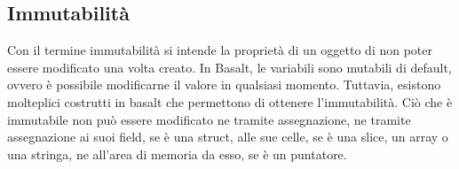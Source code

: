 \subsection{Immutabilità}
Con il termine immutabilità si intende la proprietà di un oggetto di non poter essere modificato una volta creato. In Basalt, le variabili
sono mutabili di default, ovvero è possibile modificarne il valore in qualsiasi momento. Tuttavia, esistono molteplici costrutti in basalt 
che permettono di ottenere l'immutabilità. Ciò che è immutabile non può essere modificato ne tramite assegnazione, ne tramite assegnazione 
ai suoi field, se è una struct, alle sue celle, se è una slice, un array o una stringa, ne all'area di memoria da esso, se è un puntatore. 




